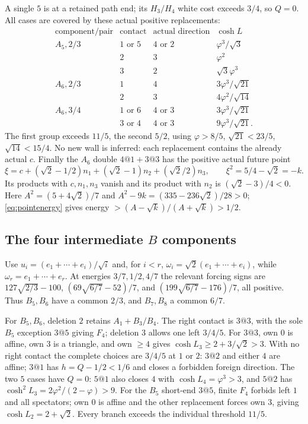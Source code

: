 \documentclass[11pt]{article}
\theoremstyle{remark}
\newcommand{\ph}{\varphi}
\begin{document}
A single $5$ is at a retained path end; its $H_3/H_4$ white cost
exceeds $3/4$, so $Q=0$. All cases are covered by these actual
positive replacements:
\[
\begin{array}{c|c|c|c}
\text{component/pair}&\text{contact}&\text{actual direction}&\cosh L\\ \hline
A_5,2/3&1\text{ or }5&4\text{ or }2&\ph^3/\sqrt3\\
&2&3&\ph^2\\
&3&2&\sqrt3\ph^3\\
A_6,2/3&1&4&3\ph^3/\sqrt{21}\\
&2&3&4\ph^2/\sqrt{14}\\
A_6,3/4&1\text{ or }6&4\text{ or }3&3\ph^3/\sqrt{21}\\
&3\text{ or }4&4\text{ or }3&9\ph^3/\sqrt{21}.
\end{array}
\]
The first group exceeds $11/5$, the second $5/2$, using
$\ph>8/5$, $\sqrt{21}<23/5$, $\sqrt{14}<15/4$.
No new wall is inferred: each replacement contains the already
actual $c$. Finally the $A_6$ double $4@1+3@3$ has the positive
actual future point
\[
 \xi=c+(\sqrt2-1/2)n_1+(\sqrt2-1)n_2+(\sqrt2/2)n_3,
 \qquad \xi^2=5/4-\sqrt2=-k.
\]
Its products with $c,n_1,n_3$ vanish and its product with $n_2$
is $(\sqrt2-3)/4<0$. Here $A^2=(5+4\sqrt2)/7$ and
$A^2-9k=(335-236\sqrt2)/28>0$; \eqref{eq:pointenergy} gives
energy $>(A-\sqrt k)/(A+\sqrt k)>1/2$.

\subsection{The four intermediate \texorpdfstring{$B$}{B} components}

Use $u_i=(e_1+\cdots+e_i)/\sqrt i$ and, for $i<r$,
$\omega_i=\sqrt2(e_1+\cdots+e_i)$, while
$\omega_r=e_1+\cdots+e_r$.
At energies $3/7,1/2,4/7$ the relevant forcing signs are
$127\sqrt{2/3}-100$, $(69\sqrt{6/7}-52)/7$, and
$(199\sqrt{6/7}-176)/7$, all positive.
Thus $B_5,B_6$ have a common $2/3$, and $B_7,B_8$ a common $6/7$.

For $B_5,B_6$, deletion $2$ retains $A_1+B_3/B_4$.
The right contact is $3@3$, with the sole $B_5$ exception $3@5$
giving $F_4$; deletion $3$ allows one left $3/4/5$.
For $3@3$, own $0$ is affine, own $3$ is a triangle, and own
$\ge4$ gives $\cosh L_3\ge2+3/\sqrt2>3$.
With no right contact the complete choices are $3/4/5$ at $1$ or
$2$: $3@2$ and either $4$ are affine; $3@1$ has
$h=Q-1/2<1/6$ and closes a forbidden foreign direction.
The two $5$ cases have $Q=0$: $5@1$ also closes $4$ with
$\cosh L_4=\ph^3>3$, and $5@2$ has
$\cosh^2L_3=2\ph^2/(2-\ph)>9$.
For the $B_5$ short-end $3@5$, finite $F_4$ forbids left $1$
and all spectators; own $0$ is affine and the other replacement
forces own $3$, giving $\cosh L_2=2+\sqrt2$.
Every branch exceeds the individual threshold $11/5$.
\end{document}
